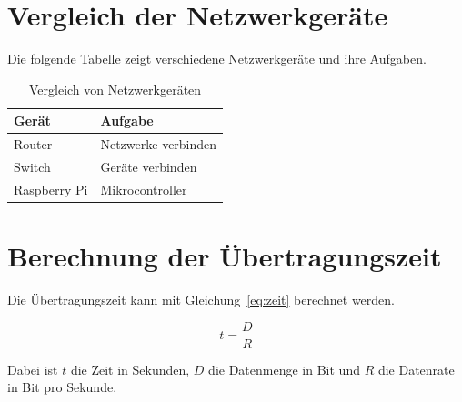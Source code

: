 \documentclass[12pt,a4paper]{article}
\begin{document}
\section{Vergleich der Netzwerkgeräte}

Die folgende Tabelle zeigt verschiedene
Netzwerkgeräte und ihre Aufgaben.

\begin{table}[H]
\centering
\begin{tabular}{|l|l|}
\hline
Gerät & Aufgabe \\ \hline
Router & Netzwerke verbinden \\ \hline
Switch & Geräte verbinden \\ \hline
Raspberry Pi & Mikrocontroller \\ \hline
\end{tabular}
\caption{Vergleich von Netzwerkgeräten}
\label{tab:geraete}
\end{table}

\section{Berechnung der Übertragungszeit}

Die Übertragungszeit kann mit
Gleichung~\ref{eq:zeit} berechnet werden.

\begin{equation}
t = \frac{D}{R}
\label{eq:zeit}
\end{equation}

Dabei ist $t$ die Zeit in Sekunden,
$D$ die Datenmenge in Bit und
$R$ die Datenrate in Bit pro Sekunde.


\printbibliography
\end{document}

